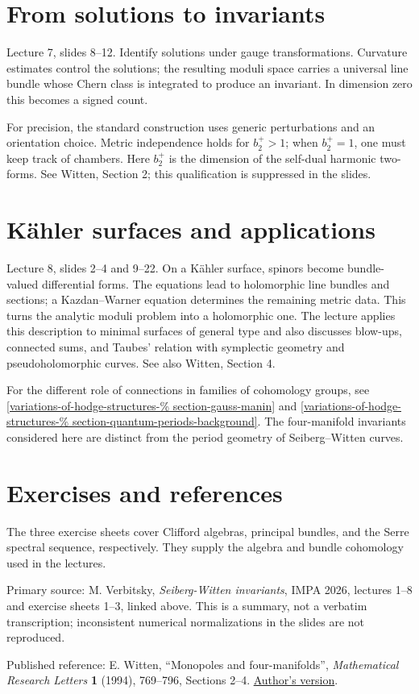 \section{From solutions to invariants}
\label{section-invariants}

\noindent
Lecture 7, slides 8--12.
Identify solutions under gauge
transformations. Curvature estimates
control the solutions; the resulting
moduli space carries a universal line
bundle whose Chern class is integrated
to produce an invariant. In dimension
zero this becomes a signed count.

\medskip\noindent
For precision, the standard construction
uses generic perturbations and an
orientation choice. Metric independence
holds for $b_2^+>1$; when $b_2^+=1$,
one must keep track of chambers.
Here $b_2^+$ is the dimension of the
self-dual harmonic two-forms.
See Witten, Section 2; this qualification
is suppressed in the slides.

\section{K\"ahler surfaces and applications}
\label{section-kahler}

\noindent
Lecture 8, slides 2--4 and 9--22.
On a K\"ahler surface, spinors become
bundle-valued differential forms.
The equations lead to holomorphic line
bundles and sections; a Kazdan--Warner
equation determines the remaining metric
data. This turns the analytic moduli
problem into a holomorphic one.
The lecture applies this description to
minimal surfaces of general type and
also discusses blow-ups, connected sums,
and Taubes' relation with symplectic
geometry and pseudoholomorphic curves.
See also Witten, Section 4.

For the different role of connections in
families of cohomology groups, see
\ref{variations-of-hodge-structures-%
section-gauss-manin} and
\ref{variations-of-hodge-structures-%
section-quantum-periods-background}.
The four-manifold invariants considered
here are distinct from the period geometry
of Seiberg--Witten curves.

\section{Exercises and references}
\label{section-references}

\noindent
The three exercise sheets cover Clifford
algebras, principal bundles, and the
Serre spectral sequence, respectively.
They supply the algebra and bundle
cohomology used in the lectures.

\medskip\noindent
Primary source: M. Verbitsky,
{\it Seiberg-Witten invariants},
IMPA 2026, lectures 1--8 and
exercise sheets 1--3, linked above.
This is a summary, not a verbatim
transcription; inconsistent numerical
normalizations in the slides are not
reproduced.

\medskip\noindent
Published reference: E. Witten,
``Monopoles and four-manifolds'',
{\it Mathematical Research Letters}
{\bf 1} (1994), 769--796,
Sections 2--4.
\href{https://arxiv.org/abs/hep-th/9411102}
{Author's version}.


